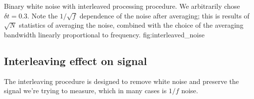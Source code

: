 \documentclass[twocolumn]{article}
\begin{document}
{Binary white noise with interleaved processing procedure.
We arbitrarily chose $\delta t = 0.3$.
Note the $1/\sqrt{f}$ dependence of the noise after averaging; this is results of $\sqrt{N}$ statistics of averaging the noise, combined with the choice of the averaging bandwidth linearly proportional to frequency.}
{fig:interleaved_noise}

\subsection{Interleaving effect on signal}

The interleaving procedure is designed to remove white noise and preserve the signal we're trying to measure, which in many cases is $1/f$ noise.
\end{document}
